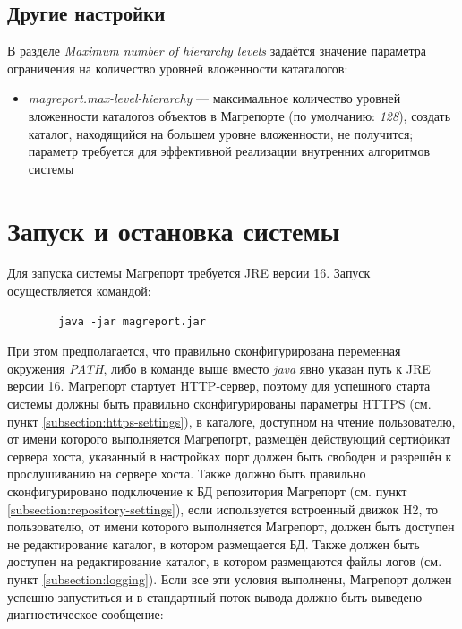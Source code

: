 \documentclass[../user-manual.tex]{subfiles}
\begin{document}
	\subsection{Другие настройки}
	
	В разделе \textit{Maximum number of hierarchy levels} задаётся значение параметра ограничения на количество уровней вложенности кататалогов:
	
	\begin{itemize}
		\item \textit{magreport.max-level-hierarchy} --- максимальное количество уровней вложенности каталогов объектов в Магрепорте (по умолчанию: \textit{128}), создать каталог, находящийся на большем уровне вложенности, не получится; параметр требуется для эффективной реализации внутренних алгоритмов системы
	\end{itemize}

	
	\section{Запуск и остановка системы}
	
	Для запуска системы Магрепорт требуется JRE версии 16. Запуск осуществляется командой:

	\begin{lstlisting}
		java -jar magreport.jar
	\end{lstlisting}
	
	При этом предполагается, что правильно сконфигурирована переменная окружения \textit{PATH}, либо в команде выше вместо \textit{java} явно указан путь к JRE версии 16. Магрепорт стартует HTTP-сервер, поэтому для успешного старта системы должны быть правильно сконфигурированы параметры HTTPS (см. пункт \ref{subsection:https-settings}), в каталоге, доступном на чтение пользователю, от имени которого выполняется Магрепогрт, размещён действующий сертификат сервера хоста, указанный в настройках порт должен быть свободен и разрешён к прослушиванию на сервере хоста. Также должно быть правильно сконфигурировано подключение к БД репозитория Магрепорт (см. пункт \ref{subsection:repository-settings}), если используется встроенный движок H2, то пользователю, от имени которого выполняется Магрепорт, должен быть доступен не редактирование каталог, в котором размещается БД. Также должен быть доступен на редактирование каталог, в котором размещаются файлы логов (см. пункт \ref{subsection:logging}). Если все эти условия выполнены, Магрепорт должен успешно запуститься и в стандартный поток вывода должно быть выведено диагностическое сообщение:
	
\end{document}
